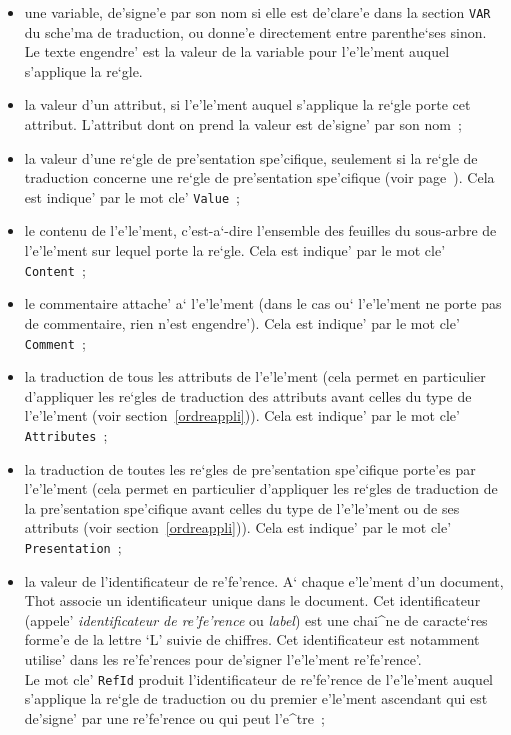 {\begin{itemize}
\item une variable, de'signe'e par son nom si elle est de'clare'e dans la
 section {\tt VAR} du sche'ma de traduction, ou donne'e directement entre
 parenthe`ses sinon. Le texte engendre' est la valeur de la variable pour
 l'e'le'ment auquel s'applique la re`gle.

\item la valeur d'un attribut, si l'e'le'ment auquel s'applique la re`gle
 porte cet attribut. L'attribut dont on prend la valeur est de'signe' par
 son nom~;

\item la valeur d'une re`gle de pre'sentation spe'cifique, seulement si la
 re`gle de traduction concerne une re`gle de pre'sentation spe'cifique (voir
 page~\pageref{valpres}). Cela est indique' par le mot cle' {\tt Value}~;

\item le contenu de l'e'le'ment, c'est-a`-dire l'ensemble des feuilles du
 sous-arbre de l'e'le'ment sur lequel porte la re`gle. Cela est indique'
 par le mot cle' {\tt Content}~;

\item le commentaire attache' a` l'e'le'ment (dans le cas ou` l'e'le'ment
 ne porte pas de commentaire, rien n'est engendre'). Cela est indique' par
 le mot cle' {\tt Comment}~;

\item la traduction de tous les attributs de l'e'le'ment (cela permet en
 particulier d'appliquer les re`gles de traduction des attributs avant celles
 du type de l'e'le'ment (voir section~\ref{ordreappli})). Cela est indique'
 par le mot cle' {\tt Attributes}~;

\item la traduction de toutes les re`gles de pre'sentation spe'cifique
 porte'es par l'e'le'ment (cela permet en particulier d'appliquer les
 re`gles de traduction de la pre'sentation spe'cifique avant celles
 du type de l'e'le'ment ou de ses attributs (voir section~\ref{ordreappli})).
 Cela est indique' par le mot cle' {\tt Presentation}~;

\item la valeur de l'identificateur de re'fe'rence. A` chaque e'le'ment d'un
 document, Thot associe un identificateur unique dans le document. Cet
 identificateur (appele' {\it identificateur de re'fe'rence} ou {\it label})
 est une chai^ne de caracte`res forme'e de la lettre `L' suivie de chiffres.
 Cet identificateur est notamment utilise' dans les re'fe'rences pour
 de'signer l'e'le'ment re'fe'rence'. \\
 Le mot cle' {\tt RefId} produit l'identificateur de  re'fe'rence de
 l'e'le'ment auquel s'applique la re`gle de traduction ou du premier
 e'le'ment ascendant qui est de'signe' par une re'fe'rence ou
 qui peut l'e^tre~;


\end{itemize}}
